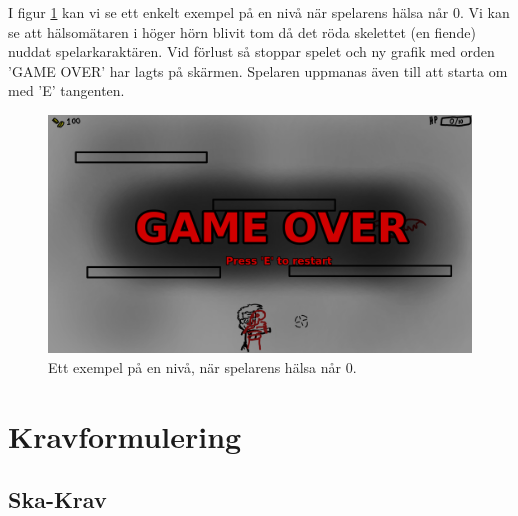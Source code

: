 \documentclass{TDP005mall}
\begin{document}
I figur \ref{fig:3} kan vi se ett enkelt exempel på en nivå när spelarens hälsa når 0. Vi kan se att hälsomätaren i höger hörn blivit tom då det röda skelettet (en fiende) nuddat spelarkaraktären. Vid förlust så stoppar spelet och ny grafik med orden 'GAME OVER' har lagts på skärmen. Spelaren uppmanas även till att starta om med 'E' tangenten.
\begin{figure}[H]
         \begin{center}
             \includegraphics[width=15cm]{Graphic/lose_concept.png}
             \caption{\label{fig:3} Ett exempel på en nivå, när spelarens hälsa når 0.}
         \end{center}
\end{figure}

\section{Kravformulering}

\subsection{Ska-Krav}
\end{document}
